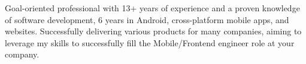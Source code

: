 %
%
%
\par{
Goal-oriented professional with 13+ years of experience and a proven knowledge of software development, 6 years in Android, cross-platform mobile apps, and websites. Successfully delivering various products for many companies, aiming to leverage my skills to successfully fill the Mobile/Frontend engineer role at your company.
}